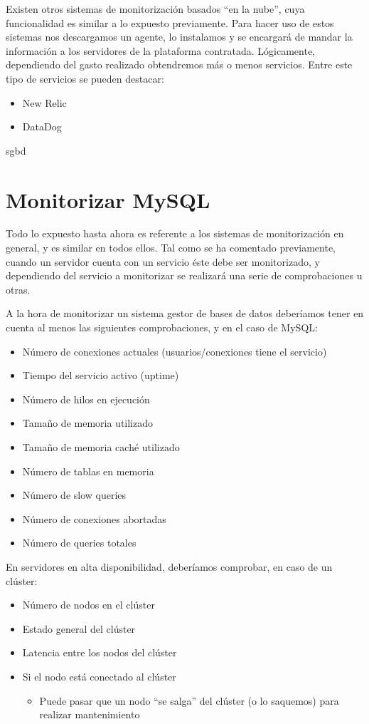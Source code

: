Existen otros sistemas de monitorización basados “en la nube”, cuya funcionalidad es similar a lo expuesto previamente. Para hacer uso de estos sistemas nos descargamos un agente, lo instalamos y se encargará de mandar la información a los servidores de la plataforma contratada. Lógicamente, dependiendo del gasto realizado obtendremos más o menos servicios. Entre este tipo de servicios se pueden destacar:
\begin{itemize}
    \item New Relic
    \item DataDog
\end{itemize}

\def\test{sgbd}
\ifx\test\@minititle

\section{Monitorizar MySQL}
Todo lo expuesto hasta ahora es referente a los sistemas de monitorización en general, y es similar en todos ellos. Tal como se ha comentado previamente, cuando un servidor cuenta con un servicio éste debe ser monitorizado, y dependiendo del servicio a monitorizar se realizará una serie de comprobaciones u otras.

A la hora de monitorizar un sistema gestor de bases de datos deberíamos tener en cuenta al menos las siguientes comprobaciones, y en el caso de MySQL:
\begin{itemize}
    \item Número de conexiones actuales (usuarios/conexiones tiene el servicio)
    \item Tiempo del servicio activo (uptime)
    \item Número de hilos en ejecución
    \item Tamaño de memoria utilizado
    \item Tamaño de memoria caché utilizado
    \item Número de tablas en memoria
    \item Número de slow queries
    \item Número de conexiones abortadas
    \item Número de queries totales
\end{itemize}

En servidores en alta disponibilidad, deberíamos comprobar, en caso de un clúster:
\begin{itemize}
    \item Número de nodos en el clúster
    \item Estado general del clúster
    \item Latencia entre los nodos del clúster
    \item Si el nodo está conectado al clúster
    \begin{itemize}
        \item  Puede pasar que un nodo “se salga” del clúster (o lo saquemos) para realizar mantenimiento
    \end{itemize}
\end{itemize}

